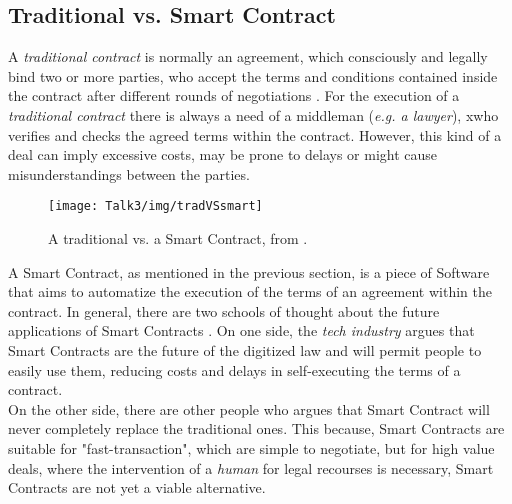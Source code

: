 \subsection{Traditional vs. Smart Contract}
A \textit{traditional contract} is normally an agreement, which consciously and legally bind two or more parties, who accept the terms and conditions contained inside the contract after different rounds of negotiations \cite{SC12,SC13}. For the execution of a \textit{traditional contract} there is always a need of a middleman (\textit{e.g. a lawyer}), xwho verifies and checks the agreed terms within the contract. However, this kind of a deal can imply excessive costs, may be prone to delays or might cause misunderstandings between the parties. 
           \begin{figure}[H]
         \begin{center}
         \texttt{[image: Talk3/img/tradVSsmart]}
         \end{center}
         \caption{A traditional vs. a Smart Contract, from \cite{SC2}.}
         \label{label}
       \end{figure}
A Smart Contract, as mentioned in the previous section, is a piece of Software that aims to automatize the execution of the terms of an agreement within the contract.
In general, there are two schools of thought about the future applications of Smart Contracts \cite{future}. On one side, the \textit{tech industry} argues that Smart Contracts are the future of the digitized law and will permit people to easily use them, reducing costs and delays in self-executing the terms of a contract. \\
On the other side, there are other people who argues that Smart Contract will never completely replace the traditional ones. This because, Smart Contracts are suitable for "fast-transaction", which are simple to negotiate, but for high value deals, where the intervention of a \textit{human} for legal recourses is necessary, Smart Contracts are not yet a viable alternative.








